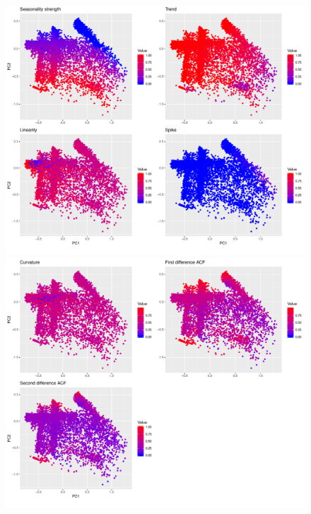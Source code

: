 \documentclass[a4paper,12pt]{article}
\begin{document}
\begin{figure}[!h]
	
	\begin{center}
		\includegraphics[width=0.8
		\textwidth]{str_5}%

		\includegraphics[width=0.8
		\textwidth]{str_6}%

	\end{center}
	
	
\end{figure} 


\newpage
\end{document}
